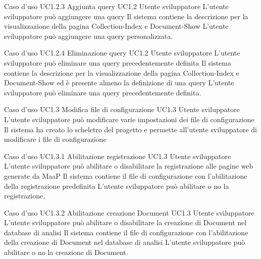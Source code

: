 \UCtitle
{Caso d'uso UC1.2.3}
{Aggiunta query}
\UC
{UC1.2}
{Utente sviluppatore}
{L'utente sviluppatore può aggiungere una query}
{Il sistema contiene la descrizione per la visualizzazione della pagina Collection-Index e Document-Show}
\scenario
{L'utente sviluppatore può aggiungere una query personalizzata.}

\UCtitle
{Caso d'uso UC1.2.4}
{Eliminazione query}
\UC
{UC1.2}
{Utente sviluppatore}
{L'utente sviluppatore può eliminare una query precedentemente definita}
{Il sistema contiene la descrizione per la visualizzazione della pagina Collection-Index e Document-Show ed è presente almeno la definizione di una query}
\scenario
{L'utente sviluppatore può eliminare una query precedentemente definita.}

\UCtitle
{Caso d'uso UC1.3}
{Modifica file di configurazione}
\UC
{UC1.3}
{Utente sviluppatore}
{L'utente sviluppatore  può modificare varie impostazioni dei file di configurazione}
{Il sistema ha creato lo scheletro del progetto e permette all'utente sviluppatore di modificare i file di configurazione}

\UCtitle
{Caso d'uso UC1.3.1}
{Abilitazione registrazione}
\UC
{UC1.3}
{Utente sviluppatore}
{L'utente sviluppatore può abilitare o disabilitare la registrazione alle pagine web generate da MaaP}
{Il sistema contiene il file di configurazione con l'abilitazione della registrazione predefinita}
\scenario
{L'utente sviluppatore può abilitare o no la registrazione.}

\UCtitle
{Caso d'uso UC1.3.2}
{Abilitazione creazione Document}
\UC
{UC1.3}
{Utente sviluppatore}
{L'utente sviluppatore può abilitare o disabilitare la creazione di Document nel database di analisi}
{Il sistema contiene il file di configurazione con l'abilitazione della creazione di Document nel database di analisi}
\scenario
{L'utente sviluppatore può abilitare o no la creazione di Document.}


